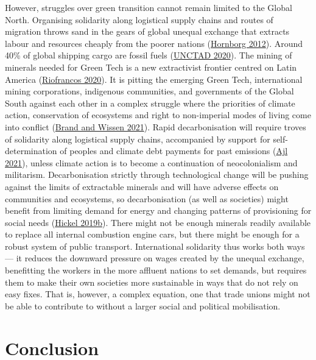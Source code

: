 \documentclass[a4paper, nobind]{templates/ociamthesis}
\begin{document}
However, struggles over green transition cannot remain limited to the Global North. Organising solidarity along logistical supply chains and routes of migration throws sand in the gears of global unequal exchange that extracts labour and resources cheaply from the poorer nations (\protect\hyperlink{ref-hornborg_global_2012}{Hornborg 2012}). Around 40\% of global shipping cargo are fossil fuels (\protect\hyperlink{ref-unctad_review_2020}{UNCTAD 2020}). The mining of minerals needed for Green Tech is a new extractivist frontier centred on Latin America (\protect\hyperlink{ref-riofrancos_resource_2020}{Riofrancos 2020}). It is pitting the emerging Green Tech, international mining corporations, indigenous communities, and governments of the Global South against each other in a complex struggle where the priorities of climate action, conservation of ecosystems and right to non-imperial modes of living come into conflict (\protect\hyperlink{ref-brand_imperial_2021}{Brand and Wissen 2021}). Rapid decarbonisation will require troves of solidarity along logistical supply chains, accompanied by support for self-determination of peoples and climate debt payments for past emissions (\protect\hyperlink{ref-ajl_peoples_2021}{Ajl 2021}), unless climate action is to become a continuation of neocolonialism and militarism. Decarbonisation strictly through technological change will be pushing against the limits of extractable minerals and will have adverse effects on communities and ecosystems, so decarbonisation (as well as societies) might benefit from limiting demand for energy and changing patterns of provisioning for social needs (\protect\hyperlink{ref-hickel_limits_2019}{Hickel 2019b}). There might not be enough minerals readily available to replace all internal combustion engine cars, but there might be enough for a robust system of public transport. International solidarity thus works both ways --- it reduces the downward pressure on wages created by the unequal exchange, benefitting the workers in the more affluent nations to set demands, but requires them to make their own societies more sustainable in ways that do not rely on easy fixes. That is, however, a complex equation, one that trade unions might not be able to contribute to without a larger social and political mobilisation.

\hypertarget{conclusion}{%
\chapter{Conclusion}\label{conclusion}}
\end{document}
